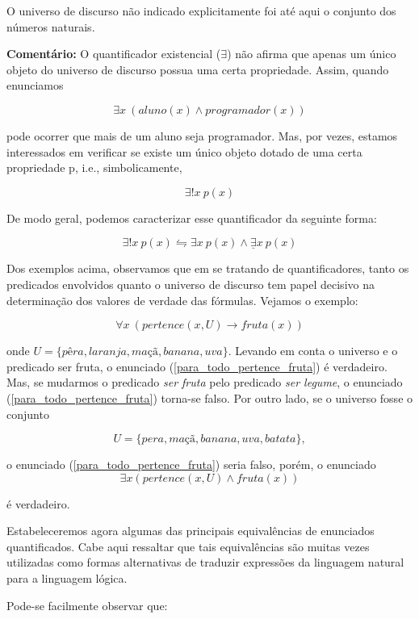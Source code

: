 \noindent O universo de discurso não indicado explicitamente foi até aqui o conjunto dos números naturais.

\noindent \textbf{Comentário:} O quantificador existencial ($\exists$) não afirma que apenas um único objeto do universo de discurso possua uma certa propriedade.
Assim, quando enunciamos

$$\exists x\ (aluno(x) \land programador(x))$$

\noindent pode ocorrer que mais de um aluno seja programador.
Mas, por vezes, estamos interessados em verificar se existe um único objeto dotado de uma certa propriedade p, i.e., simbolicamente,

$$\exists! x\ p(x)$$

De modo geral, podemos caracterizar esse quantificador da seguinte forma:

$$\exists! x\ p(x) \leftrightharpoons \exists x\ p(x) \land \underline{\exists}x\ p(x)$$

Dos exemplos acima, observamos que em se tratando de quantificadores, tanto os predicados envolvidos quanto o universo de discurso tem papel decisivo na determinação dos valores de verdade das fórmulas.
Vejamos o exemplo:

\begin{equation}\label{para_todo_pertence_fruta}
    \forall x\ (pertence(x, U) \to fruta (x)) \tag{1}
\end{equation}

\noindent onde $U = \{pêra, laranja, maçã, banana, uva\}$.
Levando em conta o universo e o predicado ser fruta, o enunciado (\ref{para_todo_pertence_fruta}) é verdadeiro.
Mas, se mudarmos o predicado \textit{ser fruta} pelo predicado \textit{ser legume}, o enunciado (\ref{para_todo_pertence_fruta}) torna-se falso.
Por outro lado, se o universo fosse o conjunto

$$U = \{pera, maçã, banana, uva, batata\},$$

\noindent o enunciado (\ref{para_todo_pertence_fruta}) seria falso, porém, o enunciado
$$\exists x (pertence(x, U) \land fruta(x))$$

\noindent é verdadeiro.

Estabeleceremos agora algumas das principais equivalências de enunciados quantificados.
Cabe aqui ressaltar que tais equivalências são muitas vezes utilizadas como formas alternativas de traduzir expressões da linguagem natural para a linguagem lógica.

\bigskip
Pode-se facilmente observar que:

